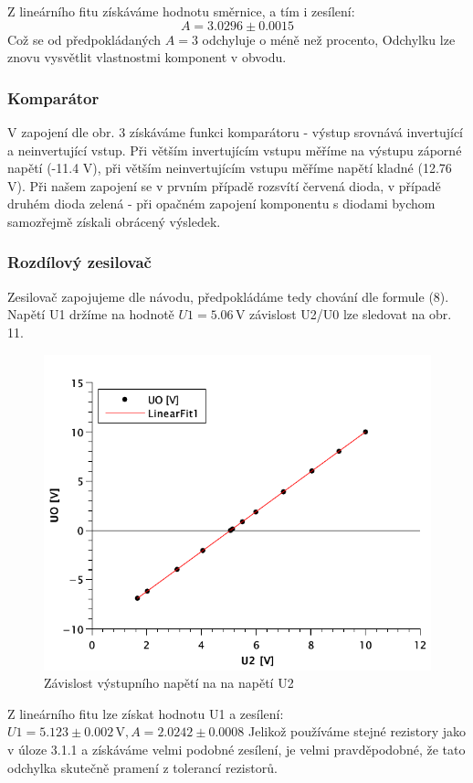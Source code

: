 \documentclass[czech,11pt,a4paper]{article}
\begin{document}
\begin{multicols}{2}
		Z lineárního fitu získáváme hodnotu směrnice, a tím i zesílení:
		\begin{equation}
			A =  3.0296 \pm 0.0015
		\end{equation}
		Což se od předpokládaných $A=3$ odchyluje o méně než procento, Odchylku lze znovu vysvětlit vlastnostmi komponent v obvodu.
		\subsubsection{Komparátor}
		V zapojení dle obr. 3 získáváme funkci komparátoru - výstup srovnává invertující a neinvertující vstup. Při větším invertujícím vstupu měříme na výstupu záporné napětí (-11.4 V), při větším neinvertujícím vstupu měříme napětí kladné (12.76 V). Při našem zapojení se v prvním případě rozsvítí červená dioda, v případě druhém dioda zelená - při opačném zapojení komponentu s diodami bychom samozřejmě získali obrácený výsledek.
		\subsubsection{Rozdílový zesilovač}
		Zesilovač zapojujeme dle návodu, předpokládáme tedy chování dle formule (8). Napětí U1 držíme na hodnotě $U1 = 5.06\,\mathrm{V}$ závislost U2/U0 lze sledovat na obr. 11.
		\begin{figure}[H]
			\centering
			\includegraphics[width=0.8\linewidth]{Graph5}
			\caption{Závislost výstupního napětí na na napětí U2}
		\end{figure}
		Z lineárního fitu lze získat hodnotu U1 a zesílení:
		$U1 = 5.123 \pm 0.002\,\mathrm{V}, A = 2.0242 \pm 0.0008$
		Jelikož používáme stejné rezistory jako v úloze 3.1.1 a získáváme velmi podobné zesílení, je velmi pravděpodobné, že tato odchylka skutečně pramení z tolerancí rezistorů.

\end{multicols}
\end{document}
